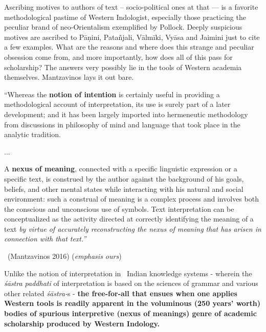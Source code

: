 Ascribing motives to authors of text – socio-political ones at that — is a favorite methodological pastime of Western Indologist, especially those practicing the peculiar brand of neo-Orientalism exemplified by Pollock. Deeply suspicious motives are ascribed to Pāṇini, Patañjali, Vālmīki, Vyāsa and Jaimini just to cite a few examples. What are the reasons and where does this strange and peculiar obsession come from, and more importantly, how does all of this pass for scholarship? The answers very possibly lie in the tools of Western academia themselves. Mantzavinos lays it out bare.

\begin{myquote}
“Whereas the \textbf{notion of intention} is certainly useful in providing a methodological account of interpretation, its use is surely part of a later development; and it has been largely imported into hermeneutic methodology from discussions in philosophy of mind and language that took place in the analytic tradition.
\end{myquote}

\begin{myquote}
...
\end{myquote}

\begin{myquote}
A \textbf{nexus of meaning}, connected with a specific linguistic expression or a specific text, is construed by the author against the background of his goals, beliefs, and other mental states while interacting with his natural and social environment: such a construal of meaning is a complex process and involves both the conscious and unconscious use of symbols. Text interpretation can be conceptualized as the activity directed at correctly identifying the meaning of a text \textit{by virtue of accurately reconstructing the nexus of meaning that has arisen in connection with that text.” }

~\hfill (Mantzavinos 2016) (\textit{emphasis ours})
\end{myquote}

Unlike the notion of interpretation in  Indian knowledge systems - wherein the \textit{śāstra paddhati} of interpretation is based on the sciences of grammar and various other related \textit{śāstra-}s - \textbf{the free-for-all that ensues when one applies Western tools is readily apparent in the voluminous (250 years’ worth) bodies of spurious interpretive (nexus of meanings) genre of academic scholarship produced by Western Indology.}

